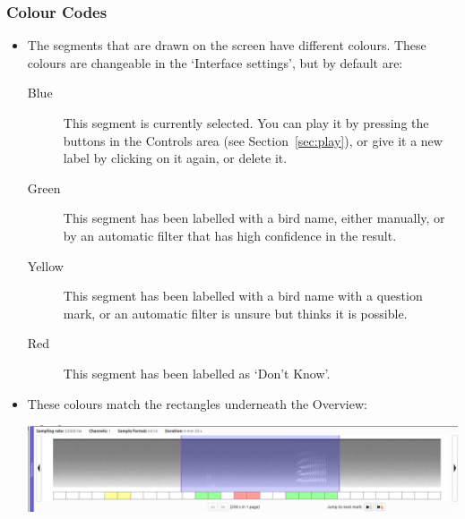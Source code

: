 \documentclass{article}
\begin{document}


\subsubsection*{Colour Codes}

\begin{itemize}

\item The segments that are drawn on the screen have different colours. These colours are changeable in the `Interface settings', but by default are:
	\begin{description} 
	\item[Blue] This segment is currently selected. You can play it by pressing the buttons in the Controls area (see Section~\ref{sec:play}), or give it a new label by clicking on it again, or delete it. 
	\item[Green] This segment has been labelled with a bird name, either manually, or by an automatic filter that has high confidence in the result.
	\item[Yellow] This segment has been labelled with a bird name with a question mark, or an automatic filter is unsure but thinks it is possible. 
	\item[Red] This segment has been labelled as `Don't Know'.
	\end{description}

\item These colours match the rectangles underneath the Overview:

\begin{center}
\includegraphics[width=.9\textwidth]{Figures/Overview}
\end{center}


\end{itemize}
\end{document}
